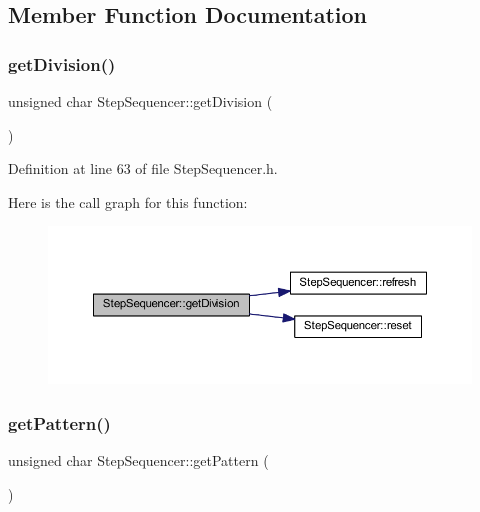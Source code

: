 \subsection{Member Function Documentation}
\mbox{\label{class_step_sequencer_a06c5c7b852aee258ad8b245058cee6ad}} 
\subsubsection{\texorpdfstring{get\+Division()}{getDivision()}}
{\footnotesize\ttfamily unsigned char Step\+Sequencer\+::get\+Division (\begin{DoxyParamCaption}{ }\end{DoxyParamCaption})\hspace{0.3cm}{\ttfamily [inline]}}



Definition at line 63 of file Step\+Sequencer.\+h.

Here is the call graph for this function\+:
\nopagebreak
\begin{figure}[H]
\begin{center}
\leavevmode
\includegraphics[width=350pt]{class_step_sequencer_a06c5c7b852aee258ad8b245058cee6ad_cgraph}
\end{center}
\end{figure}
\mbox{\label{class_step_sequencer_a6c3987d5f4a966e8fcde3f7926aca54e}} 
\subsubsection{\texorpdfstring{get\+Pattern()}{getPattern()}}
{\footnotesize\ttfamily unsigned char Step\+Sequencer\+::get\+Pattern (\begin{DoxyParamCaption}{ }\end{DoxyParamCaption})\hspace{0.3cm}{\ttfamily [inline]}}




